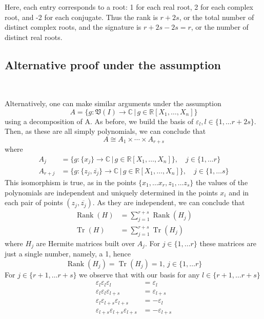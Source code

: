 \documentclass{amsart}
\begin{document}
Here, each entry corresponds to a root: 1 for each real root, 2 for each complex root, and -2 for each conjugate. Thus the rank is $r+2s$, or the total number of distinct complex roots, and the signature is $r+2s-2s=r$, or the number of distinct real roots.

\vspace{1em}

\subsection{Alternative proof under the assumption}~

Alternatively, one can make similar arguments under the assumption 
\[
A = \{g : \mathfrak{V}(I) \to \mathbb{C} \, | \, g \in \mathbb{R}[X_1, \ldots, X_n] \} 
\]
using a decomposition of A. As before, we build the basis of $\varepsilon_l, l\in \{ 1, \ldots r+2s\}$. Then, as these are all simply polynomials, we can conclude that 
\[
A \cong A_1 \times \cdots \times A_{r+s}
\]
where 
\begin{align*}
    A_j &= \{ g:\{x_j \} \to \mathbb{C} \, | \, g \in  \mathbb{R}[X_1, \ldots, X_n] \}, \quad j \in \{ 1, \ldots r\} \\
    A_{r+j} &= \{ g:\{z_j, \overline{z_j} \} \to \mathbb{C} \, | \, g \in  \mathbb{R}[X_1, \ldots, X_n] \}, \quad j \in \{ 1, \ldots s\}
\end{align*}
This isomorphism is true, as in the points $\{ x_1, \ldots x_r, z_1, \ldots z_s \}$ the values of the polynomials are independent and uniquely determined in the points $x_i$ and in each pair of points  $(z_j, \overline{z_j})$. As they are independent, we can conclude that 
\begin{align*}
    \operatorname{Rank}(H) &= \sum_{j=1}^{r+s} \operatorname{Rank}(H_j) \\
    \operatorname{Tr}(H) &= \sum_{j=1}^{r+s} \operatorname{Tr}(H_j)
\end{align*}
where $H_j$ are Hermite matrices built over $A_j$. For $j \in \{ 1, \ldots r \}$ these matrices are just a single number, namely, a 1, hence
\[
\operatorname{Rank}(H_j) = \operatorname{Tr}(H_j) = 1, \, j \in \{ 1, \ldots r \}
\]
For $j \in \{ r+1, \ldots r+s \}$ we observe that with our basis for any $l \in \{ r+1, \ldots r+s\}$
\begin{align*}
    \varepsilon_{l}\varepsilon_{l}\varepsilon_{l} &= \varepsilon_{l} \\
    \varepsilon_{l}\varepsilon_{l}\varepsilon_{l+s} &= \varepsilon_{l+s} \\
    \varepsilon_{l}\varepsilon_{l+s}\varepsilon_{l+s} &= -\varepsilon_{l} \\
    \varepsilon_{l+s}\varepsilon_{l+s}\varepsilon_{l+s} &= -\varepsilon_{l+s}
\end{align*}
\end{document}
